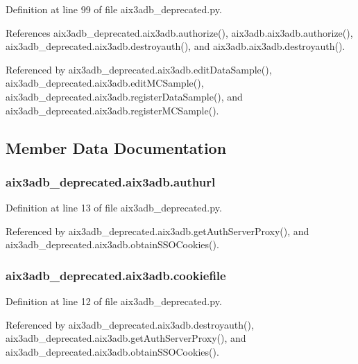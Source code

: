 Definition at line 99 of file aix3adb\-\_\-deprecated.\-py.



References aix3adb\-\_\-deprecated.\-aix3adb.\-authorize(), aix3adb.\-aix3adb.\-authorize(), aix3adb\-\_\-deprecated.\-aix3adb.\-destroyauth(), and aix3adb.\-aix3adb.\-destroyauth().



Referenced by aix3adb\-\_\-deprecated.\-aix3adb.\-edit\-Data\-Sample(), aix3adb\-\_\-deprecated.\-aix3adb.\-edit\-M\-C\-Sample(), aix3adb\-\_\-deprecated.\-aix3adb.\-register\-Data\-Sample(), and aix3adb\-\_\-deprecated.\-aix3adb.\-register\-M\-C\-Sample().



\subsection{Member Data Documentation}
\subsubsection[{authurl}]{\setlength{\rightskip}{0pt plus 5cm}aix3adb\-\_\-deprecated.\-aix3adb.\-authurl}\label{classaix3adb__deprecated_1_1aix3adb_a209888746b3f38a2eb924850a36fa81e}


Definition at line 13 of file aix3adb\-\_\-deprecated.\-py.



Referenced by aix3adb\-\_\-deprecated.\-aix3adb.\-get\-Auth\-Server\-Proxy(), and aix3adb\-\_\-deprecated.\-aix3adb.\-obtain\-S\-S\-O\-Cookies().

\subsubsection[{cookiefile}]{\setlength{\rightskip}{0pt plus 5cm}aix3adb\-\_\-deprecated.\-aix3adb.\-cookiefile}\label{classaix3adb__deprecated_1_1aix3adb_af033ccecd5302312bf229a940130681c}


Definition at line 12 of file aix3adb\-\_\-deprecated.\-py.



Referenced by aix3adb\-\_\-deprecated.\-aix3adb.\-destroyauth(), aix3adb\-\_\-deprecated.\-aix3adb.\-get\-Auth\-Server\-Proxy(), and aix3adb\-\_\-deprecated.\-aix3adb.\-obtain\-S\-S\-O\-Cookies().

